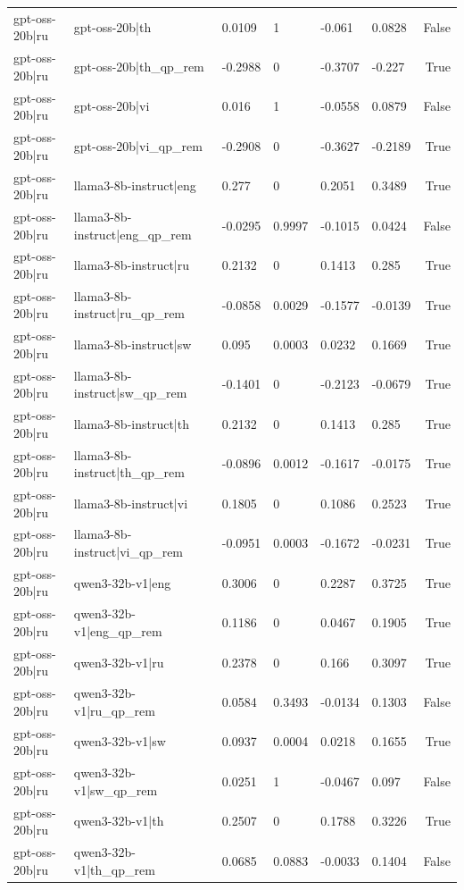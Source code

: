 \begin{table}
\begin{tabular}{llllllr}
gpt-oss-20b|ru & gpt-oss-20b|th & 0.0109 & 1 & -0.061 & 0.0828 & False \\
gpt-oss-20b|ru & gpt-oss-20b|th_qp_rem & -0.2988 & 0 & -0.3707 & -0.227 & True \\
gpt-oss-20b|ru & gpt-oss-20b|vi & 0.016 & 1 & -0.0558 & 0.0879 & False \\
gpt-oss-20b|ru & gpt-oss-20b|vi_qp_rem & -0.2908 & 0 & -0.3627 & -0.2189 & True \\
gpt-oss-20b|ru & llama3-8b-instruct|eng & 0.277 & 0 & 0.2051 & 0.3489 & True \\
gpt-oss-20b|ru & llama3-8b-instruct|eng_qp_rem & -0.0295 & 0.9997 & -0.1015 & 0.0424 & False \\
gpt-oss-20b|ru & llama3-8b-instruct|ru & 0.2132 & 0 & 0.1413 & 0.285 & True \\
gpt-oss-20b|ru & llama3-8b-instruct|ru_qp_rem & -0.0858 & 0.0029 & -0.1577 & -0.0139 & True \\
gpt-oss-20b|ru & llama3-8b-instruct|sw & 0.095 & 0.0003 & 0.0232 & 0.1669 & True \\
gpt-oss-20b|ru & llama3-8b-instruct|sw_qp_rem & -0.1401 & 0 & -0.2123 & -0.0679 & True \\
gpt-oss-20b|ru & llama3-8b-instruct|th & 0.2132 & 0 & 0.1413 & 0.285 & True \\
gpt-oss-20b|ru & llama3-8b-instruct|th_qp_rem & -0.0896 & 0.0012 & -0.1617 & -0.0175 & True \\
gpt-oss-20b|ru & llama3-8b-instruct|vi & 0.1805 & 0 & 0.1086 & 0.2523 & True \\
gpt-oss-20b|ru & llama3-8b-instruct|vi_qp_rem & -0.0951 & 0.0003 & -0.1672 & -0.0231 & True \\
gpt-oss-20b|ru & qwen3-32b-v1|eng & 0.3006 & 0 & 0.2287 & 0.3725 & True \\
gpt-oss-20b|ru & qwen3-32b-v1|eng_qp_rem & 0.1186 & 0 & 0.0467 & 0.1905 & True \\
gpt-oss-20b|ru & qwen3-32b-v1|ru & 0.2378 & 0 & 0.166 & 0.3097 & True \\
gpt-oss-20b|ru & qwen3-32b-v1|ru_qp_rem & 0.0584 & 0.3493 & -0.0134 & 0.1303 & False \\
gpt-oss-20b|ru & qwen3-32b-v1|sw & 0.0937 & 0.0004 & 0.0218 & 0.1655 & True \\
gpt-oss-20b|ru & qwen3-32b-v1|sw_qp_rem & 0.0251 & 1 & -0.0467 & 0.097 & False \\
gpt-oss-20b|ru & qwen3-32b-v1|th & 0.2507 & 0 & 0.1788 & 0.3226 & True \\
gpt-oss-20b|ru & qwen3-32b-v1|th_qp_rem & 0.0685 & 0.0883 & -0.0033 & 0.1404 & False \\

\end{tabular}
\end{table}
